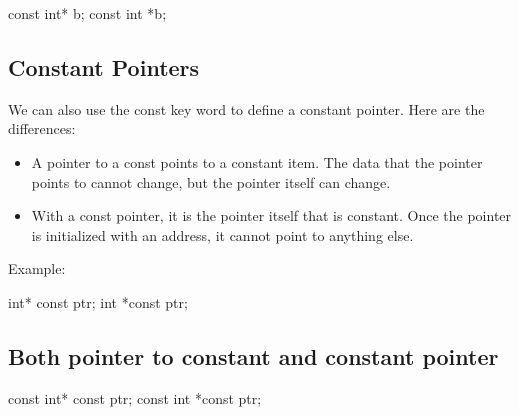 \documentclass{report}
\begin{document}
    \begin{cppcode}
const int* b; 
const int *b;
    \end{cppcode}
    
    \bigbreak \noindent 
    \bigbreak \noindent 

    \pagebreak
    \subsection{Constant Pointers}
    \bigbreak \noindent 
    We can also use the const key word to define a constant pointer. Here are the differences:
    \begin{itemize}
        \item A pointer to a const points to a constant item. The data that the pointer points to cannot change, but the pointer itself can change. 
        \item With a const pointer, it is the pointer itself that is constant.  Once the pointer is initialized with an address, it cannot point to anything else.
    \end{itemize}
    \bigbreak \noindent 
    Example:
    \bigbreak \noindent 
    
    \begin{cppcode}
int* const ptr;
int *const ptr;
    \end{cppcode}
    

    \bigbreak \noindent 
    \subsection{Both pointer to constant and constant pointer}
    \bigbreak \noindent 
    
    \begin{cppcode}
const int* const ptr;
const int *const ptr;
    \end{cppcode}
    

    \bigbreak \noindent 
\end{document}
